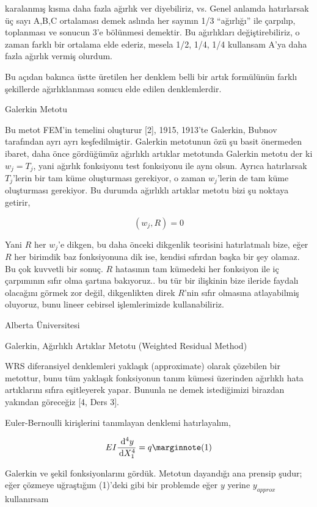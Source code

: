 \documentclass[12pt,fleqn]{article}\usepackage{../../common}
\begin{document}
karalanmış kısma daha fazla ağırlık ver diyebiliriz, vs. Genel anlamda
hatırlarsak üç sayı A,B,C ortalaması demek aslında her sayının 1/3 ``ağırlığı''
ile çarpılıp, toplanması ve sonucun 3'e bölünmesi demektir. Bu ağırlıkları
değiştirebiliriz, o zaman farklı bir ortalama elde ederiz, mesela 1/2, 1/4, 1/4
kullansam A'ya daha fazla ağırlık vermiş olurdum.

Bu açıdan bakınca üstte üretilen her denklem belli bir artık formülünün
farklı şekillerde ağırlıklanması sonucu elde edilen denklemlerdir.

Galerkin Metotu

Bu metot FEM'in temelini oluşturur [2], 1915, 1913'te Galerkin, Bubnov
tarafından ayrı ayrı keşfedilmiştir. Galerkin metotunun özü şu basit önermeden
ibaret, daha önce gördüğümüz ağırlıklı artıklar metotunda Galerkin metotu der ki
$w_j = T_j$, yani ağırlık fonksiyonu test fonksiyonu ile aynı olsun. Ayrıca
hatırlarsak $T_j$'lerin bir tam küme oluşturması gerekiyor, o zaman $w_j$'lerin
de tam küme oluşturması gerekiyor. Bu durumda ağırlıklı artıklar metotu bizi şu
noktaya getirir,

$$
(w_j,R) = 0
$$

Yani $R$ her $w_j$'e dikgen, bu daha önceki dikgenlik teorisini hatırlatmalı
bize, eğer $R$ her birimdik baz fonksiyonuna dik ise, kendisi sıfırdan başka bir
şey olamaz. Bu çok kuvvetli bir sonuç. $R$ hatasının tam kümedeki her fonksiyon
ile iç çarpımının sıfır olma şartına bakıyoruz.. bu tür bir ilişkinin bize
ileride faydalı olacağını görmek zor değil, dikgenlikten direk $R$'nin sıfır
olmasına atlayabilmiş oluyoruz, bunu lineer cebirsel işlemlerimizde
kullanabiliriz.

Alberta Üniversitesi

Galerkin, Ağırlıklı Artıklar Metotu (Weighted Residual Method)

WRS diferansiyel denklemleri yaklaşık (approximate) olarak çözebilen bir
metottur, bunu tüm yaklaşık fonksiyonun tanım kümesi üzerinden ağırlıklı hata
artıklarını sıfıra eşitleyerek yapar. Bununla ne demek istediğimizi birazdan
yakından göreceğiz [4, Ders 3].

Euler-Bernoulli kirişlerini tanımlayan denklemi hatırlayalım,

$$
E I \frac{\ud^4 y}{\ud X_1^4} = q
\mlabel{1}
$$

Galerkin ve şekil fonksiyonlarını gördük. Metotun dayandığı ana prensip şudur;
eğer çözmeye uğraştığım (1)'deki gibi bir problemde eğer $y$ yerine $y_{approx}$
kullanırsam
\end{document}

